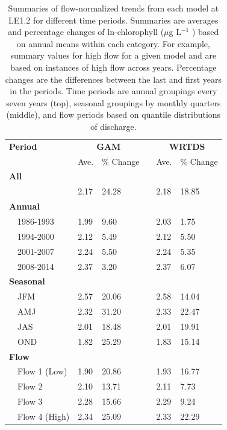 \documentclass[letterpaper,12pt,oneside]{article}\usepackage[]{graphicx}\usepackage[]{color}
\newcommand{\mugl}{$\mu$g L$^{-1}$ }
\begin{document}
\begin{table}[!tbp]
\caption{Summaries of flow-normalized trends from each model at LE1.2 for different time periods.  Summaries are averages and percentage changes of ln-chlorophyll (\mugl) based on annual means within each category.  For example, summary values for high flow for a given model and are based on instances of high flow across years.  Percentage changes are the differences between the last and first years in the periods.  Time periods are annual groupings every seven years (top), seasonal groupings by monthly quarters (middle), and flow periods based on quantile distributions of discharge.\label{tab:trendsLE12}} 
\begin{center}
\begin{tabular}{lllcll}
\hline\hline
\multicolumn{1}{l}{\bfseries Period}&\multicolumn{2}{c}{\bfseries GAM}&\multicolumn{1}{c}{\bfseries }&\multicolumn{2}{c}{\bfseries WRTDS}\tabularnewline
\cline{2-3} \cline{5-6}
\multicolumn{1}{l}{}&\multicolumn{1}{c}{Ave.}&\multicolumn{1}{c}{\% Change}&\multicolumn{1}{c}{}&\multicolumn{1}{c}{Ave.}&\multicolumn{1}{c}{\% Change}\tabularnewline
\hline
{\bfseries All}&&&&&\tabularnewline
~~&2.17&24.28&&2.18&18.85\tabularnewline
\hline
{\bfseries Annual}&&&&&\tabularnewline
~~1986-1993&1.99& 9.60&&2.03& 1.75\tabularnewline
~~1994-2000&2.12& 5.49&&2.12& 5.50\tabularnewline
~~2001-2007&2.24& 5.50&&2.24& 5.35\tabularnewline
~~2008-2014&2.37& 3.20&&2.37& 6.07\tabularnewline
\hline
{\bfseries Seasonal}&&&&&\tabularnewline
~~JFM&2.57&20.06&&2.58&14.04\tabularnewline
~~AMJ&2.32&31.20&&2.33&22.47\tabularnewline
~~JAS&2.01&18.48&&2.01&19.91\tabularnewline
~~OND&1.82&25.29&&1.83&15.14\tabularnewline
\hline
{\bfseries Flow}&&&&&\tabularnewline
~~Flow 1 (Low)&1.90&20.86&&1.93&16.77\tabularnewline
~~Flow 2&2.10&13.71&&2.11& 7.73\tabularnewline
~~Flow 3&2.28&15.66&&2.29& 9.24\tabularnewline
~~Flow 4 (High)&2.34&25.09&&2.33&22.29\tabularnewline
\hline
\end{tabular}\end{center}

\end{table}
\end{document}
